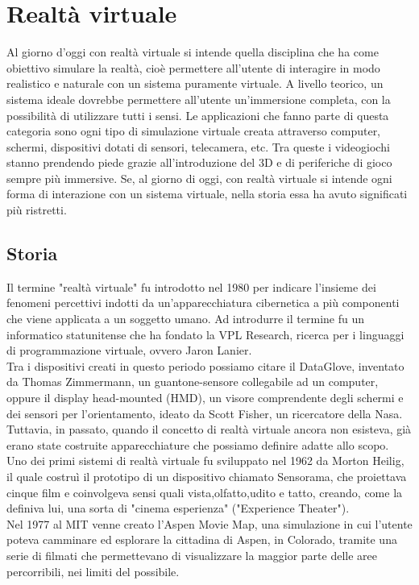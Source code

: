
\chapter{Realtà virtuale}

Al giorno d'oggi con realtà virtuale si intende quella disciplina che ha come obiettivo simulare la realtà, cioè permettere all'utente di interagire in modo realistico e naturale con un sistema puramente virtuale. A livello teorico, un sistema ideale dovrebbe permettere all'utente un'immersione completa, con la possibilità di utilizzare tutti i sensi. Le applicazioni che fanno parte di questa categoria sono ogni tipo di simulazione virtuale creata attraverso computer, schermi, dispositivi dotati di sensori, telecamera, etc. Tra queste i videogiochi stanno prendendo piede grazie all'introduzione del 3D e di periferiche di gioco sempre più immersive.
Se, al giorno di oggi, con realtà virtuale si intende ogni forma di interazione con un sistema virtuale, nella storia essa ha avuto significati più ristretti.
 
\section{Storia}
Il termine "realtà virtuale" fu introdotto nel 1980  per indicare l'insieme dei fenomeni percettivi indotti da un'apparecchiatura cibernetica a più componenti che viene applicata a un soggetto umano.
Ad introdurre il termine fu un informatico statunitense che ha fondato la VPL Research, ricerca per i linguaggi di programmazione virtuale, ovvero Jaron Lanier.\cite{realta2}\\
Tra i dispositivi creati in questo periodo possiamo citare  il DataGlove, inventato da Thomas Zimmermann, un guantone-sensore collegabile ad un computer, oppure il display head-mounted (HMD), un visore comprendente degli schermi e dei sensori per l'orientamento, ideato da  Scott Fisher, un ricercatore della Nasa.\\
Tuttavia, in passato, quando il concetto di realtà virtuale ancora non esisteva, già erano state costruite apparecchiature che possiamo definire adatte allo scopo.\\
Uno dei primi sistemi di realtà virtuale fu sviluppato nel 1962 da Morton Heilig, il quale costruì il prototipo di un dispositivo chiamato Sensorama, che proiettava cinque film e coinvolgeva sensi quali vista,olfatto,udito e tatto, creando, come la definiva lui, una sorta di "cinema esperienza" ("Experience Theater").\\
Nel 1977 al MIT venne creato l'Aspen Movie Map, una simulazione in cui l'utente poteva camminare ed esplorare la cittadina di Aspen, in Colorado, tramite una serie di filmati che permettevano di visualizzare la maggior parte delle aree percorribili, nei limiti del possibile.

